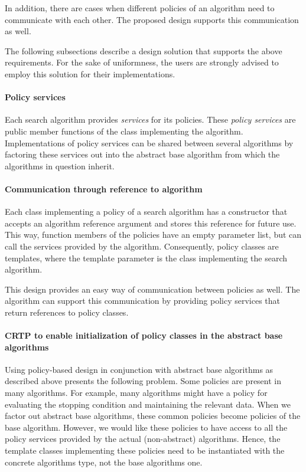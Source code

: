 In addition, there are cases when different policies of an algorithm need to communicate with each other. The proposed design supports this communication as well.

The following subsections describe a design solution that supports the above requirements. For the sake of uniformness, the users are strongly advised to employ this solution for their implementations.\hypertarget{index_s-services}{}\paragraph{Policy services}\label{index_s-services}
Each search algorithm provides {\itshape services} for its policies. These {\itshape policy services} are public member functions of the class implementing the algorithm. Implementations of policy services can be shared between several algorithms by factoring these services out into the abstract base algorithm from which the algorithms in question inherit.\hypertarget{index_s-communication}{}\paragraph{Communication through reference to algorithm}\label{index_s-communication}
Each class implementing a policy of a search algorithm has a constructor that accepts an algorithm reference argument and stores this reference for future use. This way, function members of the policies have an empty parameter list, but can call the services provided by the algorithm. Consequently, policy classes are templates, where the template parameter is the class implementing the search algorithm.

This design provides an easy way of communication between policies as well. The algorithm can support this communication by providing policy services that return references to policy classes.\hypertarget{index_s-base-crtp}{}\paragraph{C\+R\+T\+P to enable initialization of policy classes in the abstract base algorithms}\label{index_s-base-crtp}
Using policy-\/based design in conjunction with abstract base algorithms as described above presents the following problem. Some policies are present in many algorithms. For example, many algorithms might have a policy for evaluating the stopping condition and maintaining the relevant data. When we factor out abstract base algorithms, these common policies become policies of the base algorithm. However, we would like these policies to have access to all the policy services provided by the actual (non-\/abstract) algorithms. Hence, the template classes implementing these policies need to be instantiated with the concrete algorithm\textquotesingle{}s type, not the base algorithm\textquotesingle{}s one.

